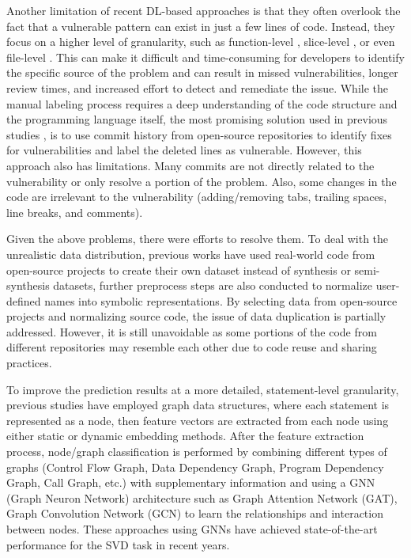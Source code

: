 \documentclass{ieeeaccess}
\begin{document}
\par Another limitation of recent DL-based approaches is that they often overlook the fact that a vulnerable pattern can exist in just a few lines of code. Instead, they focus on a higher level of granularity, such as function-level \cite{Are, devign, func_level_1,func_level_2,func_level_4}, slice-level \cite{VUDENC, vuldeepeeker2, SySeVR, VulDeeLocator,vuldeekeeper}, or even file-level \cite{File_level_1, File_level_2, File_level_3, file_level_4}. This can make it difficult and time-consuming for developers to identify the specific source of the problem and can result in missed vulnerabilities, longer review times, and increased effort to detect and remediate the issue.
While the manual labeling process requires a deep understanding of the code structure and the programming language itself, the most promising solution used in previous studies \cite{Linevd, MVD}, is to use commit history from open-source repositories to identify fixes for vulnerabilities and label the deleted lines as vulnerable. However, this approach also has limitations. Many commits are not directly related to the vulnerability or only resolve a portion of the problem. Also, some changes in the code are irrelevant to the vulnerability (adding/removing tabs, trailing spaces, line breaks, and comments).


\par %
    Given the above problems, there were efforts to resolve them. To deal with the unrealistic data distribution, previous works have used real-world code from open-source projects to create their own dataset\cite{devign, Are, Linevd, VUDENC, cvefixes} instead of synthesis or semi-synthesis datasets\cite{sard, SATE, Draper}, further preprocess steps are also conducted to normalize user-defined names into symbolic representations\cite{vuldeekeeper, vuldeepeeker2, DeepWukong,SySeVR,VulDeeLocator}. By selecting data from open-source projects and normalizing source code, the issue of data duplication is partially addressed. However, it is still unavoidable as some portions of the code from different repositories may resemble each other due to code reuse and sharing practices. 
\par To improve the prediction results at a more detailed, statement-level granularity, previous studies\cite{MVD, Linevd, IVDetect} have employed graph data structures, where each statement is represented as a node, then feature vectors are extracted from each node using either static\cite{glove, doc2vec, word2vec} or dynamic embedding\cite{codebert} methods. After the feature extraction process, node/graph classification is performed by combining different types of graphs (Control Flow Graph, Data Dependency Graph, Program Dependency Graph, Call Graph, etc.) with supplementary information  and using a GNN (Graph Neuron Network) architecture such as Graph  Attention Network (GAT)\cite{GAT},  Graph Convolution Network (GCN)\cite{GCN} to learn the relationships and interaction between nodes. These approaches using GNNs have achieved state-of-the-art performance for the SVD task in recent years.
\end{document}
